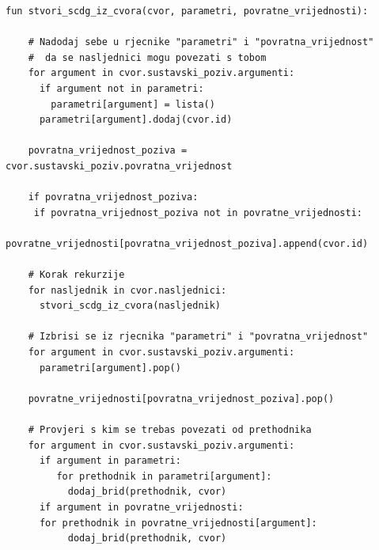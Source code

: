 \begin{lstlisting}[caption={Rekurzivna funkcija za stvaranje SCDG grafa iz čvora sustavskog traga},label={cod:trace_u_scdg}]
fun stvori_scdg_iz_cvora(cvor, parametri, povratne_vrijednosti):
  
    # Nadodaj sebe u rjecnike "parametri" i "povratna_vrijednost"
    #  da se nasljednici mogu povezati s tobom
    for argument in cvor.sustavski_poziv.argumenti:
      if argument not in parametri:
        parametri[argument] = lista()
      parametri[argument].dodaj(cvor.id)
    
    povratna_vrijednost_poziva = cvor.sustavski_poziv.povratna_vrijednost
    
    if povratna_vrijednost_poziva:
     if povratna_vrijednost_poziva not in povratne_vrijednosti:
       povratne_vrijednosti[povratna_vrijednost_poziva].append(cvor.id)
     
    # Korak rekurzije
    for nasljednik in cvor.nasljednici:
      stvori_scdg_iz_cvora(nasljednik)
    
    # Izbrisi se iz rjecnika "parametri" i "povratna_vrijednost"
    for argument in cvor.sustavski_poziv.argumenti:
      parametri[argument].pop()
    
    povratne_vrijednosti[povratna_vrijednost_poziva].pop()
    
    # Provjeri s kim se trebas povezati od prethodnika
    for argument in cvor.sustavski_poziv.argumenti:
      if argument in parametri:
         for prethodnik in parametri[argument]:
           dodaj_brid(prethodnik, cvor)
      if argument in povratne_vrijednosti:
      for prethodnik in povratne_vrijednosti[argument]:
           dodaj_brid(prethodnik, cvor) 
\end{lstlisting}


